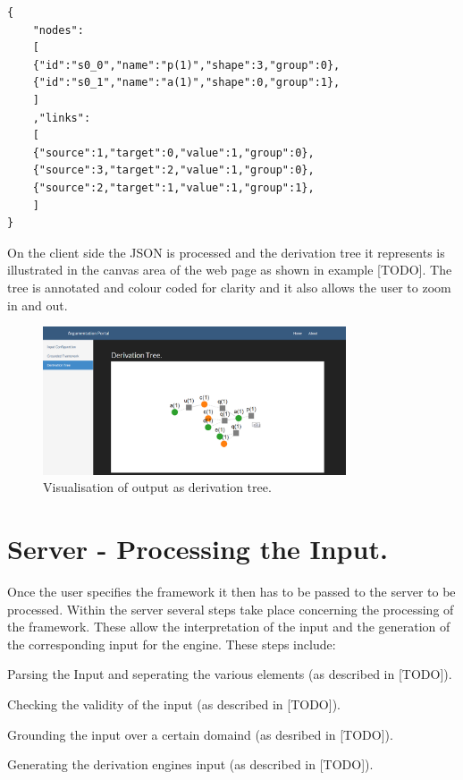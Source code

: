 \begin{Verbatim}[frame=single]
{ 
	"nodes":
	[
	{"id":"s0_0","name":"p(1)","shape":3,"group":0},
	{"id":"s0_1","name":"a(1)","shape":0,"group":1},
	]
	,"links":
	[
	{"source":1,"target":0,"value":1,"group":0},
	{"source":3,"target":2,"value":1,"group":0},
	{"source":2,"target":1,"value":1,"group":1},
	]
}
\end{Verbatim}

On the client side the JSON is processed and the derivation tree it represents is illustrated in the canvas area of the web page as shown in example [TODO]. The tree is annotated and colour coded for clarity and it also allows the user to zoom in and out.

\begin{figure}[h]
    \centering
    \includegraphics[width=0.8\textwidth]{argumentationTree.png}
    \caption{Visualisation of output as derivation tree.}
    \label{fig:arg_tree}
\end{figure}

\section{Server - Processing the Input.}

Once the user specifies the framework it then has to be passed to the server to be processed. Within the server several steps take place concerning the processing of the framework. These allow the interpretation of the input and the generation of the corresponding input for the engine. These steps include:

\begin{itemize*}
\item Parsing the Input and seperating the various elements (as described in [TODO]).
\item Checking the validity of the input (as described in [TODO]).
\item Grounding the input over a certain domaind (as desribed in [TODO]).
\item Generating the derivation engines input (as described in [TODO]).
\end{itemize*}

